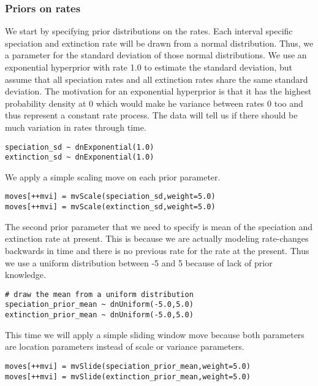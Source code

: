 \subsubsection{Priors on rates}
We start by specifying prior distributions on the rates.
Each interval specific speciation and extinction rate will be drawn from a normal distribution.
Thus, we a parameter for the standard deviation of those normal distributions.
We use an exponential hyperprior with rate 1.0 to estimate the standard deviation, but assume that all speciation rates and all extinction rates share the same standard deviation.
The motivation for an exponential hyperprior is that it has the highest probability density at 0 which would make he variance between rates 0 too and thus represent a constant rate process.
The data will tell us if there should be much variation in rates through time.
{\tt \begin{snugshade*}
\begin{lstlisting}
speciation_sd ~ dnExponential(1.0)
extinction_sd ~ dnExponential(1.0)
\end{lstlisting}
\end{snugshade*}}
We apply a simple scaling move on each prior parameter.
{\tt \begin{snugshade*}
\begin{lstlisting}
moves[++mvi] = mvScale(speciation_sd,weight=5.0)
moves[++mvi] = mvScale(extinction_sd,weight=5.0)
\end{lstlisting}
\end{snugshade*}}

The second prior parameter that we need to specify is mean of the speciation and extinction rate at present.
This is because we are actually modeling rate-changes backwards in time and there is no previous rate for the rate at the present.
Thus we use a uniform distribution between -5 and 5 because of lack of prior knowledge.
{\tt \begin{snugshade*}
\begin{lstlisting}
# draw the mean from a uniform distribution
speciation_prior_mean ~ dnUniform(-5.0,5.0)
extinction_prior_mean ~ dnUniform(-5.0,5.0)
\end{lstlisting}
\end{snugshade*}}
This time we will apply a simple sliding window move because both parameters are location parameters instead of scale or variance parameters.
{\tt \begin{snugshade*}
\begin{lstlisting}
moves[++mvi] = mvSlide(speciation_prior_mean,weight=5.0)
moves[++mvi] = mvSlide(extinction_prior_mean,weight=5.0)
\end{lstlisting}
\end{snugshade*}}


